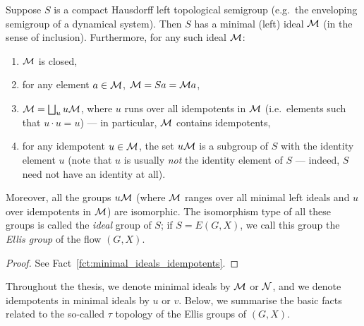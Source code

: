 	
	\begin{fct}
		\label{fct:ideals_ellis_pre}
		Suppose $S$ is a compact Hausdorff left topological semigroup (e.g.\ the enveloping semigroup of a dynamical system). Then $S$ has a minimal (left) ideal ${\mathcal M}$ (in the sense of inclusion). Furthermore, for any such ideal ${\mathcal M}$:
		\begin{enumerate}
			\item
			${\mathcal M}$ is closed,
			\item
			for any element $a\in {\mathcal M}$, ${\mathcal M}=Sa={\mathcal M} a$,
			\item
			${\mathcal M}=\bigsqcup_u u{\mathcal M}$, where $u$ runs over all idempotents in ${\mathcal M}$ (i.e.\ elements such that $u\cdot u=u$) --- in particular, ${\mathcal M}$ contains idempotents,
			\item
			for any idempotent $u\in {\mathcal M}$, the set $u{\mathcal M}$ is a subgroup of $S$ with the identity element $u$ (note that $u$ is usually \emph{not} the identity element of $S$ --- indeed, $S$ need not have an identity at all).
		\end{enumerate}
		Moreover, all the groups $u{\mathcal M}$ (where ${\mathcal M}$ ranges over all minimal left ideals and $u$ over idempotents in ${\mathcal M}$) are isomorphic. The isomorphism type of all these groups is called the {\em ideal} group of $S$; if $S=E(G,X)$, we call this group the {\em Ellis group} of the flow $(G,X)$.
	\end{fct}
	\begin{proof}
		See Fact~\ref{fct:minimal_ideals_idempotents}.
	\end{proof}
	Throughout the thesis, we denote minimal ideals by ${\mathcal M}$ or ${\mathcal N}$, and we denote idempotents in minimal ideals by $u$ or $v$.
	Below, we summarise the basic facts related to the so-called $\tau$ topology of the Ellis groups of $(G,X)$.
	
